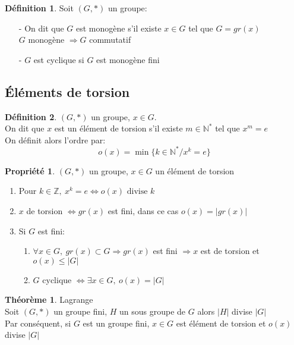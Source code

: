 \documentclass[fleqn]{article}
\theoremstyle{definition} \newtheorem*{defi}{D\'efinition}
\theoremstyle{definition} \newtheorem*{theo}{Th\'eor\`eme}
\theoremstyle{definition} \newtheorem*{coro}{Corollaire}
\theoremstyle{remark} \newtheorem*{rqs}{Remarques}
\theoremstyle{definition} \newtheorem*{prop}{Propri\'et\'e}
\begin{document}
\begin{defi} Soit $(G, *)$ un groupe:
	\begin{itemize}
		\item [-] On dit que $G$ est monog\`ene s'il existe $x \in G$ tel que $G = gr(x)$ \\
			$G$ monog\`ene $\Rightarrow G$ commutatif
		\item [-] $G$ est cyclique si $G$ est monog\`ene fini
	\end{itemize}
\end{defi}

\subsection{\'El\'ements de torsion}
\begin{defi}
$(G,*)$ un groupe, $x \in G$. \\
On dit que $x$ est un \'el\'ement de torsion s'il existe $m \in \mathbb{N}^{*}$ tel que $x^m = e$ \\
On d\'efinit alors l'ordre par:
	\[o(x) = \min\{k \in \mathbb{N}^* / x^k = e\}\]
\end{defi}

\begin{prop} $(G,*)$ un groupe, $x \in G$ un \'el\'ement de torsion
	\begin{enumerate}
		\item Pour $k \in \mathbb{Z},\ x^k = e \Leftrightarrow o(x) \text{ divise } k$
		\item $x$ de torsion $\Leftrightarrow gr(x)$ est fini, dans ce cas $o(x) = |gr(x)|$
		\item Si $G$ est fini:
			\begin{enumerate}
				\item $\forall x \in G,\ gr(x) \subset G \Rightarrow gr(x)$ est fini $\Rightarrow x$ est de torsion et $o(x) \leq |G|$
				\item $G$ cyclique $\Leftrightarrow \exists x \in G,\ o(x) = |G|$
			\end{enumerate}
	\end{enumerate}
\end{prop}

\begin{theo} Lagrange \\
	Soit $(G, *)$ un groupe fini, $H$ un sous groupe de $G$ alors $|H|$ divise $|G|$ \\
	Par cons\'equent, si $G$ est un groupe fini, $x\in G$ est \'el\'ement de torsion et $o(x)$ divise  $|G|$
\end{theo}
\end{document}
